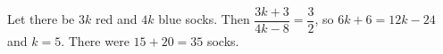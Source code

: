 Let there be $3k$ red and $4k$ blue socks. Then $\dfrac{3k+3}{4k-8}=\dfrac{3}{2}$, so $6k+6=12k-24$ and $k=5$. There were $15+20=\boxed{35}$ socks.
